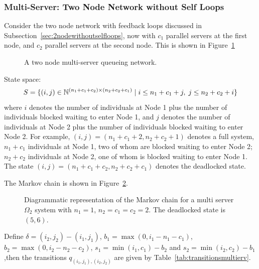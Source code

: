 \documentclass{article}
\begin{document}
\subsubsection{Multi-Server: Two Node Network without Self Loops}\label{sec:2nodemulti}
Consider the two node network with feedback loops discussed in Subsection~\ref{sec:2nodewithoutselfloops}, now with $c_1$ parallel servers at the first node, and $c_2$ parallel servers at the second node.
This is shown in Figure~\ref{fig:queueingnetwork_2nodemulti}

\begin{figure}[!htbp]
  
  \caption{A two node multi-server queueing network.}
  \label{fig:queueingnetwork_2nodemulti}
\end{figure}

State space:
        \[S = \{(i,j)\in\mathbb{N}^{(n_1+c_1+c_2)\times (n_2+c_2+c_1)} \nonscript\; | \nonscript\; i \leq n_1+c_1+j, \nonscript\; j \leq n_2+c_2+i\}\]
where $i$ denotes the number of individuals at Node 1 plus the number of individuals blocked waiting to enter Node 1, and $j$ denotes the number of individuals at Node 2 plus the number of individuals blocked waiting to enter Node 2.
For example, $(i, j) = (n_1+c_1+2, n_2+c_2+1)$ denotes a full system, $n_1+c_1$ individuals at Node 1, two of whom are blocked waiting to enter Node 2; $n_2+c_2$ individuals at Node 2, one of whom is blocked waiting to enter Node 1.
The state $(i, j) = (n_1+c_1+c_2, n_2+c_2+c_1)$ denotes the deadlocked state.

The Markov chain is shown in Figure~\ref{fig:2nodeMCms}.

\begin{figure}[!htbp]
    
    \caption{Diagrammatic representation of the Markov chain for a multi server $\Omega_2$ system with $n_1=1$, $n_2=c_1=c_2=2$. The deadlocked state is $(5,6)$.}
    \label{fig:2nodeMCms}
\end{figure}

Define $\delta = (i_2, j_2) - (i_1, j_1)$, $b_1 = \max(0, i_1-n_1-c_1)$, $b_2 = \max(0, i_2-n_2-c_2)$, $s_1 = \min(i_1, c_1)-b_2$ and $s_2 = \min(i_2, c_2)-b_1$ ,then the transitions $q_{(i_1, j_1),(i_2, j_2)}$ are given by Table~\ref{tab:transitionsmultierv}.
\end{document}
